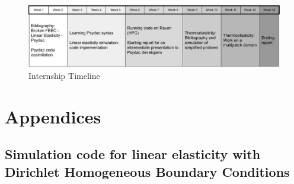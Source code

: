 \documentclass[a4paper,12pt,twoside]{report}
\begin{document}
\begin{figure}[!t]
	\centering
	\includegraphics[width=1\textwidth]{figures/Timeline.jpg}
	\caption{Internship Timeline}
	\label{fig:internship_timeline}
\end{figure}

\newpage
\vspace{-1cm}
\printbibliography[heading=bibnumbered]

\newpage
\chapter{Appendices}
\section{Simulation code for linear elasticity with Dirichlet Homogeneous Boundary Conditions}
\label{sec:lin_elas_dirichlet}
\end{document}
